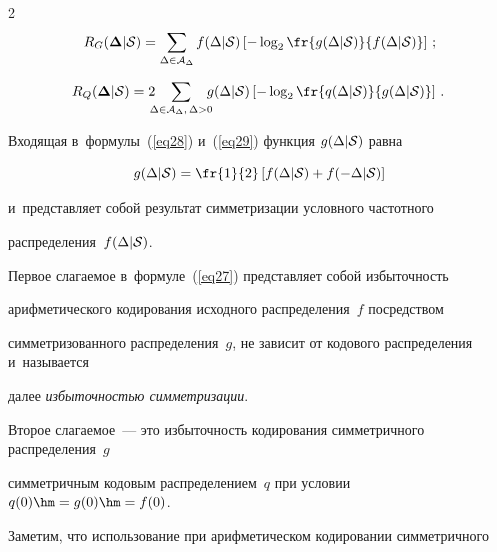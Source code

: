 \begin{multicols}{2}
\begin{equation}
\label{eq28}

R_G(\boldsymbol{\Delta}|{\cal S}) = \sum\limits_{\Delta\in{\cal A}_{\Delta}}

f(\Delta|{\cal S}) \left[-\log_{2}\fr{g(\Delta|{\cal S})}{f(\Delta|{\cal S})}\right]\,;

\end{equation}

\begin{equation}

\hspace*{-2mm}R_Q(\boldsymbol{\Delta}|{\cal S}) = 2\hspace*{-2mm}

 \sum\limits_{\Delta\in{\cal A}_{\Delta},\,\Delta>0}\hspace*{-2mm}

g(\Delta|{\cal S}) \left[-\log_{2}\fr{q(\Delta|{\cal S})}{g(\Delta|{\cal S})}\right]\,.

\!\!\label{eq29}

\end{equation}

Входящая в~формулы~(\ref{eq28}) и~(\ref{eq29}) функция $g(\Delta|{\cal S})$ равна

\begin{equation}

\label{eq30}

g(\Delta|{\cal S}) = \fr{1}{2} \left[ f(\Delta|{\cal S}) + f(-\Delta|{\cal S}) \right]

\end{equation}

и~представляет собой результат симметризации условного частотного 

распределения~$ f(\Delta|{\cal S})$.



Первое слагаемое в~формуле~(\ref{eq27}) представ\-ляет собой избыточность 

арифметического ко\-ди\-ро\-вания исходного распределения~$f$ посредством 

симметризованного распределения~$g$, не зависит от кодового распределения и~называется 

далее \textit{избыточностью симметризации}. 

Второе слагаемое~--- это избыточность кодирования симметричного распределения~$g$ 

симметричным кодовым распределением~$q$ при условии $q(0)\hm= g(0) \hm= f(0)$.



Заметим, что использование при арифметическом кодировании симметричного 


\end{multicols}
